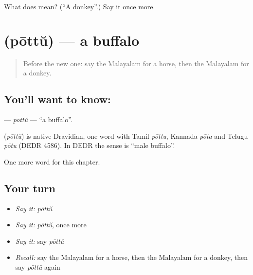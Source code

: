 \begin{tcolorbox}[breakable,colback=teal!4,colframe=teal!35!black,title={Before you move on}]
What does  mean? (\textquotedblleft{}A donkey\textquotedblright{}.) Say it once more.
\end{tcolorbox}
\section[\texorpdfstring{\ml{പോത്ത്} (pōttŭ)}{പോത്ത് (pōttŭ)}]{ (pōttŭ) — a buffalo}

\label{lesson:ML-C151-pottu}



\begin{quote}
Before the new one: say the Malayalam for a horse, then the Malayalam for a donkey.
\end{quote}

\subsection*{You'll want to know: }
\textbf{} — \emph{pōttŭ} — \textquotedblleft{}a buffalo\textquotedblright{}.

\begin{cousinweb}
\textbf{} (\emph{pōttŭ}) is native Dravidian, one word with Tamil \emph{pōttu}, Kannada \emph{pōta} and Telugu \emph{pōtu} (DEDR 4586). In DEDR the sense is \textquotedblleft{}male buffalo\textquotedblright{}.
\end{cousinweb}

\begin{grammarlens}[title={What you've built}]
One more word for this chapter.
\end{grammarlens}

\subsection*{Your turn}
\begin{itemize}
\raggedright
  \item \emph{Say it:} \emph{pōttŭ}
  \item \emph{Say it:} \emph{pōttŭ}, once more
  \item \emph{Say it:} say \emph{pōttŭ}
  \item \emph{Recall:} say the Malayalam for a horse, then the Malayalam for a donkey, then say \emph{pōttŭ} again
\end{itemize}

